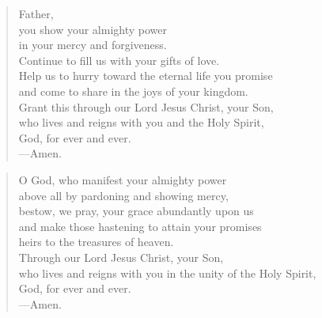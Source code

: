 \prayer

\setlength{\leftmargini}{\prayerleftmargini}

\begin{verse}
Father,\\
you show your almighty power\\
in your mercy and forgiveness.\\
Continue to fill us with your gifts of love.\\
Help us to hurry toward the eternal life you promise\\
and come to share in the joys of your kingdom.\\
Grant this through our Lord Jesus Christ, your Son,\\
who lives and reigns with you and the Holy Spirit,\\
God, for ever and ever.\\
{\color{red}---\thinspace}Amen.
\end{verse}


\begin{verse}
O God, who manifest your almighty power\\
above all by pardoning and showing mercy,\\
bestow, we pray, your grace abundantly upon us\\
and make those hastening to attain your promises\\
heirs to the treasures of heaven.\\
Through our Lord Jesus Christ, your Son,\\
who lives and reigns with you in the unity of the Holy Spirit,\\
God, for ever and ever.\\
{\color{red}---\thinspace}Amen.
\end{verse}

\setlength{\leftmargini}{\defleftmargini}